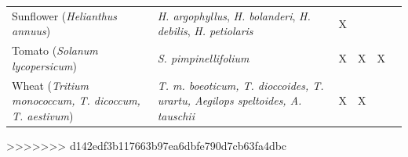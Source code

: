 \documentclass[11pt]{article}
\begin{document}
\begin{adjustbox}{angle=90}
\begin{tabular}{G{3cm}G{3.5cm}G{3cm}G{3.5cm}G{3.5cm}G{2cm}}
Sunflower (\emph{Helianthus annuus}) & \emph{H. argophyllus}, \emph{H. bolanderi}, \emph{H. debilis}, \emph{H. petiolaris} & X &   &   & \cite{rieseberg2007hybridization}\\
Tomato (\emph{Solanum lycopersicum}) & \emph{S. pimpinellifolium} & X & X & X & \cite{rick1958role} \\

 Wheat (\emph{Tritium monococcum, T. dicoccum, T. aestivum}) & \emph{T. m. boeoticum, T. dioccoides, T. urartu, Aegilops speltoides, A. tauschii} & X & X &  & \cite{zohary1969wild} \\
    \end{tabular}
\end{adjustbox}
































>>>>>>> d142edf3b117663b97ea6dbfe790d7cb63fa4dbc

\end{document}
